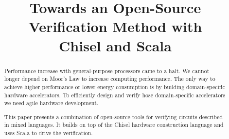 \documentclass[conference]{IEEEtran}
\begin{document}

\title{Towards an Open-Source Verification Method with\\
Chisel and Scala}

\author{
\and
{}
}



\maketitle \thispagestyle{empty}

\begin{abstract}
Performance increase with general-purpose processors came to a halt.
We cannot longer depend on Moor's Law to increase computing performance.
The only way to achieve higher performance or lower energy consumption
is by building domain-specific hardware accelerators.
To efficiently design and verify hose domain-specific accelerators we need
agile hardware development.

This paper presents a combination of open-source tools for verifying
circuits described in mixed languages. It builds on top of the Chisel
hardware construction language and uses Scala to drive the verification.
\end{abstract}
\end{document}

